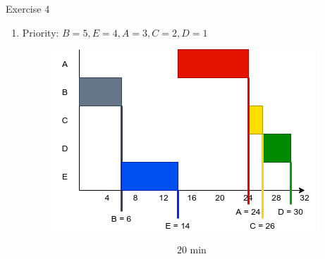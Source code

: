 \documentclass[10pt]{beamer}
\begin{document}
\begin{frame}{Exercise 4}
\begin{enumerate}
        \item Priority: $B = 5, E = 4, A = 3, C = 2, D = 1$ \\ \vspace{0.7cm}
        \begin{minipage}{0.49\textwidth}
            \begin{figure}
                    \includegraphics[keepaspectratio, width=\textwidth, height=\textheight]{img/priority.png} \\
                \end{figure}
        \end{minipage}\hfill \begin{minipage}{0.3\textwidth}
        \end{minipage} \vspace{0.7cm}
		 \alert{\[ 20\text{ min}\]}
		 \framebreak
		 

\end{enumerate}
\end{frame}
\end{document}
